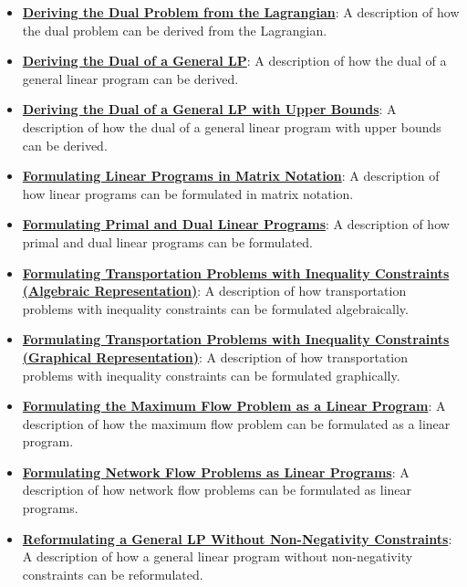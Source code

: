 \documentclass{article}%
\begin{document}
\begin{itemize}[leftmargin=*]
\item \href{https://www.math.purdue.edu/~yipn/421/2024-12-03-Duality.pdf#page=1}{\textbf{Deriving the Dual Problem from the Lagrangian}}: A description of how the dual problem can be derived from the Lagrangian. %
\item \href{https://www.math.purdue.edu/~yipn/421/2024-12-03-Duality.pdf#page=1}{\textbf{Deriving the Dual of a General LP}}: A description of how the dual of a general linear program can be derived. %
\item \href{https://www.math.purdue.edu/~yipn/421/2024-12-03-Duality.pdf#page=1}{\textbf{Deriving the Dual of a General LP with Upper Bounds}}: A description of how the dual of a general linear program with upper bounds can be derived. %
\item \href{https://www.math.purdue.edu/~yipn/421/2024-12-03-Duality.pdf#page=1}{\textbf{Formulating Linear Programs in Matrix Notation}}: A description of how linear programs can be formulated in matrix notation. %
\item \href{https://www.math.purdue.edu/~yipn/421/2024-12-03-Duality.pdf#page=1}{\textbf{Formulating Primal and Dual Linear Programs}}: A description of how primal and dual linear programs can be formulated. %
\item \href{https://www.math.purdue.edu/~yipn/421/2024-12-03-Duality.pdf#page=1}{\textbf{Formulating Transportation Problems with Inequality Constraints (Algebraic Representation)}}: A description of how transportation problems with inequality constraints can be formulated algebraically. %
\item \href{https://www.math.purdue.edu/~yipn/421/2024-12-03-Duality.pdf#page=1}{\textbf{Formulating Transportation Problems with Inequality Constraints (Graphical Representation)}}: A description of how transportation problems with inequality constraints can be formulated graphically. %
\item \href{https://www.math.purdue.edu/~yipn/421/2024-12-03-Duality.pdf#page=1}{\textbf{Formulating the Maximum Flow Problem as a Linear Program}}: A description of how the maximum flow problem can be formulated as a linear program. %
\item \href{https://www.math.purdue.edu/~yipn/421/2024-12-03-Duality.pdf#page=1}{\textbf{Formulating Network Flow Problems as Linear Programs}}: A description of how network flow problems can be formulated as linear programs. %
\item \href{https://www.math.purdue.edu/~yipn/421/2024-12-03-Duality.pdf#page=1}{\textbf{Reformulating a General LP Without Non{-}Negativity Constraints}}: A description of how a general linear program without non-negativity constraints can be reformulated. %

\end{itemize}
\end{document}
